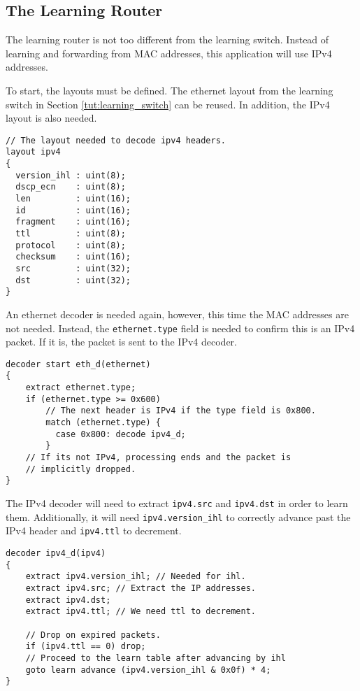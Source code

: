 \subsection{The Learning Router} \label{tut:learning_router}

The learning router is not too different from the learning switch. Instead of
learning and forwarding from MAC addresses, this application will use IPv4
addresses.

To start, the layouts must be defined. The ethernet layout
from the learning switch in Section \ref{tut:learning_switch} can be reused. In
addition, the IPv4 layout is also needed.

\begin{codepage}
\begin{lstlisting}
// The layout needed to decode ipv4 headers.
layout ipv4
{
  version_ihl : uint(8);
  dscp_ecn    : uint(8);
  len         : uint(16);
  id          : uint(16);
  fragment    : uint(16);
  ttl         : uint(8);
  protocol    : uint(8);
  checksum    : uint(16);
  src         : uint(32);
  dst         : uint(32);
}
\end{lstlisting}
\end{codepage}

An ethernet decoder is needed again, however, this time the MAC
addresses are not needed. Instead, the \texttt{ethernet.type} field is needed to confirm
this is an IPv4 packet. If it is, the packet is sent to the IPv4 decoder.

\begin{codepage}
\begin{lstlisting}
decoder start eth_d(ethernet)
{
	extract ethernet.type;
	if (ethernet.type >= 0x600)
	  	// The next header is IPv4 if the type field is 0x800.
	    match (ethernet.type) {
	      case 0x800: decode ipv4_d;
	    }
	// If its not IPv4, processing ends and the packet is
	// implicitly dropped.
}
\end{lstlisting}
\end{codepage}

The IPv4 decoder will need to extract \texttt{ipv4.src} and \texttt{ipv4.dst} in
order to learn them. Additionally, it will need \texttt{ipv4.version\_ihl} to
correctly advance past the IPv4 header and \texttt{ipv4.ttl} to decrement.

\begin{codepage}
\begin{lstlisting}
decoder ipv4_d(ipv4)
{
	extract ipv4.version_ihl; // Needed for ihl.
	extract ipv4.src; // Extract the IP addresses.
	extract ipv4.dst;
	extract ipv4.ttl; // We need ttl to decrement.

	// Drop on expired packets.
	if (ipv4.ttl == 0) drop;
	// Proceed to the learn table after advancing by ihl
	goto learn advance (ipv4.version_ihl & 0x0f) * 4;
}
\end{lstlisting}
\end{codepage}

